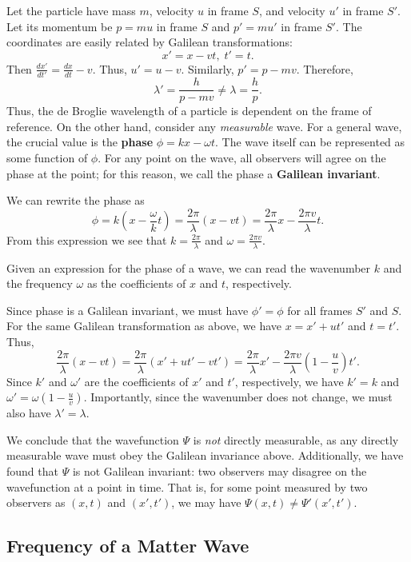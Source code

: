 Let the particle have mass $m$, velocity $u$ in frame $S$, and velocity $u'$ in frame $S'$. Let its momentum be $p=mu$ in frame $S$ and $p'=mu'$ in frame $S'$. The coordinates are easily related by Galilean transformations: $$x'=x-vt,\;t'=t.$$Then $\frac{dx'}{dt'}=\frac{dx}{dt}-v$. Thus, $u'=u-v$. Similarly, $p'=p-mv$. Therefore, $$\lambda'=\frac{h}{p-mv}\neq\lambda=\frac{h}{p}.$$Thus, the de Broglie wavelength of a particle is dependent on the frame of reference. On the other hand, consider any \textit{measurable} wave. For a general wave, the crucial value is the \textbf{phase} $\phi=kx-\omega t$. The wave itself can be represented as some function of $\phi$. For any point on the wave, all observers will agree on the phase at the point; for this reason, we call the phase a \textbf{Galilean invariant}.

We can rewrite the phase as $$\phi=k(x-\frac{\omega}{k}t)=\frac{2\pi}{\lambda}(x-vt)=\frac{2\pi}{\lambda}x-\frac{2\pi v}{\lambda}t.$$From this expression we see that $k=\frac{2\pi}{\lambda}$ and $\omega=\frac{2\pi v}{\lambda}$. 

\begin{framedtip*}
   Given an expression for the phase of a wave, we can read the wavenumber $k$ and the frequency $\omega$ as the coefficients of $x$ and $t$, respectively. 
\end{framedtip*}

Since phase is a Galilean invariant, we must have $\phi'=\phi$ for all frames $S'$ and $S$. For the same Galilean transformation as above, we have $x=x'+ut'$ and $t=t'$. Thus, $$\frac{2\pi}{\lambda}(x-vt)=\frac{2\pi}{\lambda}(x'+ut'-vt')=\frac{2\pi}{\lambda}x'-\frac{2\pi v}{\lambda}(1-\frac{u}{v})t'.$$Since $k'$ and $\omega'$ are the coefficients of $x'$ and $t'$, respectively, we have $k'=k$ and $\omega'=\omega(1-\frac{u}{v})$. Importantly, since the wavenumber does not change, we must also have $\lambda'=\lambda$. 

We conclude that the wavefunction $\Psi$ is \textit{not} directly measurable, as any directly measurable wave must obey the Galilean invariance above. Additionally, we have found that $\Psi$ is not Galilean invariant: two observers may disagree on the wavefunction at a point in time. That is, for some point measured by two observers as $(x,t)$ and $(x',t')$, we may have $\Psi(x,t)\neq\Psi'(x',t')$. 

\subsection{Frequency of a Matter Wave}
\label{freq_matter_waves}


